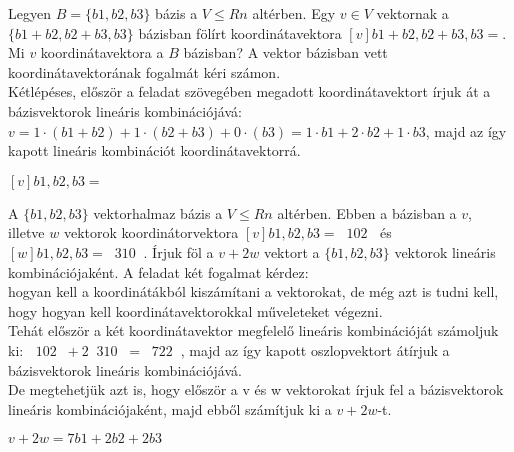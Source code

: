 \begin{frame}
  \begin{tcolorbox}[title={1/2. -R-}]
      Legyen $B = \{b1,b2,b3\}$ bázis a $V ≤ Rn$ altérben. Egy $v ∈ V$ vektornak a $\{b1 + b2,b2 + b3,b3\}$ bázisban fölírt koordinátavektora $[v]b1+b2,b2+b3,b3 =$.\\
      
      Mi $v$ koordinátavektora a $B$ bázisban?
  \tcblower
    A vektor bázisban vett koordinátavektorának fogalmát kéri számon.\\
   
    Kétlépéses, először a feladat szövegében megadott koordinátavektort írjuk át a bázisvektorok lineáris kombinációjává: $v = 1·(b1 + b2) + 1·(b2 + b3) + 0·(b3) = 1·b1 + 2·b2 + 1·b3$, majd az így kapott lineáris kombinációt koordinátavektorrá.\\
     \mmedskip
     
   $[v]b1,b2,b3 =$ 
  \end{tcolorbox}
\end{frame}

\begin{frame}
  \begin{tcolorbox}[title={1/3. -R-}]
      A $\{b1,b2,b3\}$ vektorhalmaz bázis a $V ≤ Rn$ altérben. Ebben a bázisban a $v$, illetve $w$ vektorok koordinátorvektora $[v]b1,b2,b3 =  1 0 2   $ és $[w]b1,b2,b3 =  3 1 0   $. Írjuk föl a $v+2w$ vektort a $\{b1,b2,b3\}$ vektorok lineáris kombinációjaként.
  \tcblower
    A feladat két fogalmat kérdez:\\
      hogyan kell a koordinátákból kiszámítani a vektorokat, de még azt is tudni kell, hogy hogyan kell koordinátavektorokkal műveleteket végezni.\\
      
      Tehát először a két koordinátavektor megfelelő lineáris kombinációját számoljuk ki: $  1 0 2  + 2   3 1 0  =   7 2 2   $, majd az így kapott oszlopvektort átírjuk a bázisvektorok lineáris kombinációjává.\\
      
      De megtehetjük azt is, hogy először a v és w vektorokat írjuk fel a bázisvektorok lineáris kombinációjaként, majd ebből számítjuk ki a $v+2w$-t.
      
   $v + 2w = 7b1 + 2b2 + 2b3$
  \end{tcolorbox}
\end{frame}
  
